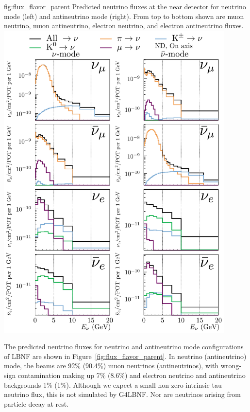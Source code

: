 \begin{dunefigure}{fig:flux_flavor_parent}
{Predicted neutrino fluxes at the near detector for neutrino mode (left) and antineutrino mode (right). From top to bottom shown are muon neutrino, muon antineutrino, electron neutrino, and electron antineutrino fluxes.}
\includegraphics[width=0.9\textwidth]{graphics/ND_HadronParentFluxComponents_0m_offaxis.pdf}

\end{dunefigure}


The predicted neutrino fluxes for neutrino and antineutrino mode configurations of LBNF are shown in Figure~\ref{fig:flux_flavor_parent}.  In neutrino (antineutrino) mode, the beams are 92\% (90.4\%) muon neutrinos (antineutrinos), with wrong-sign contamination making up 7\% (8.6\%) and electron neutrino and antineutrino backgrounds 1\% (1\%).  Although %
we expect a small non-zero intrinsic tau neutrino flux, this is not simulated by G4LBNF.  Nor are neutrinos arising from particle decay at rest. %

